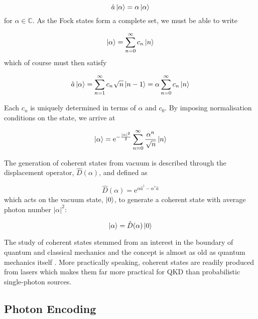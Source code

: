 \begin{equation}
	\hat{a}\ket{\alpha} = \alpha\ket{\alpha}
\end{equation}
for $\alpha \in \mathbb{C}$. As the Fock states form a complete set, we must be able to write

\begin{equation}
	\ket{\alpha} = \sum_{n=0}^\infty c_n \ket{n}
\end{equation}
which of course must then satisfy

\begin{equation}
	\hat{a}\ket{\alpha} = \sum_{n=1}^\infty c_n \sqrt{n} \ket{n-1} = \alpha  \sum_{n=0}^\infty c_n \ket{n}
\end{equation}

Each $c_n$ is uniquely determined in terms of $\alpha$ and $c_0$. By imposing normalisation conditions on the state, we arrive at

\begin{equation}
	\ket{\alpha} = \mathrm{e}^{-\frac{|\alpha|^2}{2}} \sum_{n=0}^\infty \frac{\alpha^n}{\sqrt{n}} \ket{n} 
\end{equation}

The generation of coherent states from vacuum is described through the displacement operator, $\hat{D}(\alpha)$, and defined as

\begin{equation}
	\hat{D}(\alpha) = \mathrm{e}^{\alpha\hat{a}^\dagger - \alpha^\ast\hat{a}}
\end{equation}
which acts on the vacuum state, $\ket{0}$, to generate a coherent state with average photon number $|\alpha|^2$:

\begin{equation}
	\ket{\alpha} = \hat{D}(\alpha)\ket{0}
\end{equation}

The study of coherent states stemmed from an interest in the boundary of quantum and classical mechanics and the concept is almost as old as quantum mechanics itself \cite{Schrodinger1926}. More practically speaking, coherent states are readily produced from lasers which makes them far more practical for \ac{QKD} than probabilistic single-photon sources.

\subsection{Photon Encoding}
\label{sec:photon_encoding}

